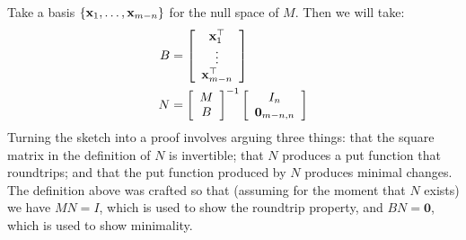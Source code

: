 Take a basis $\{\mathbf x_1,\ldots,\mathbf x_{m-n}\}$ for the null space of $M$. Then
we will take:
\begin{align*}
    B &= \left[\begin{array}{c}
            \mathbf x_1^\top \\
            \vdots \\
            \mathbf x_{m-n}^\top
        \end{array}\right] \\
    N &= \left[\begin{array}{c}
            M \\
            B
        \end{array}\right]^{-1}
        \left[\begin{array}{c}
            I_n \\
            \mathbf 0_{m-n,n}
        \end{array}\right] \\
\end{align*}
Turning the sketch into a proof involves arguing three things: that the
square matrix in the definition of $N$ is invertible; that $N$ produces a
put function that roundtrips; and that the put function produced by $N$
produces minimal changes. The definition above was crafted so that (assuming
for the moment that $N$ exists) we have $MN = I$, which is used to show the
roundtrip property, and $BN = \mathbf 0$, which is used to show minimality.

